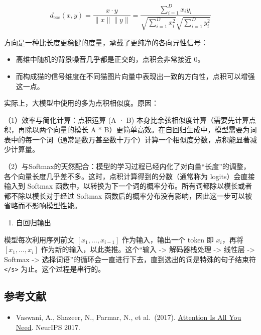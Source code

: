 \[
d_{\cos}(x,y)=\frac{x\cdot y}{\|x\|\|y\|}=\frac{\sum_{i=1}^{D}x_i y_i}{\sqrt{\sum_{i=1}^{D}x_i^2}\sqrt{\sum_{i=1}^{D}y_i^2}}
\]

方向是一种比长度更稳健的度量，承载了更纯净的各向异性信号：

\begin{itemize}
\tightlist
\item
  高维中随机的背景噪音几乎都是正交的，点积会非常接近 0。
\item
  而构成猫的信号维度在不同猫图片向量中表现出一致的方向性，点积可以增强这一点。
\end{itemize}

实际上，大模型中使用的多为点积相似度。原因：

（1）效率与简化计算\hspace{0pt}：点积运算 (A · B) 本身比余弦相似度计算（需要先计算点积，再除以两个向量的模长 \textbar\textbar A\textbar\textbar{} * \textbar\textbar B\textbar\textbar）更简单高效。在自回归生成中，模型需要为词表中的每一个词（通常是数万甚至数十万个）计算一个相似度分数，点积能显著减少计算量。

（2）与Softmax的天然配合：模型的学习过程已经内化了对向量``长度''的调整，各个向量长度几乎差不多。这时，点积计算得到的分数（通常称为 logits）会直接输入到 Softmax 函数中，以转换为下一个词的概率分布。所有词都除以模长或者都不除以模长对于经过 Softmax 函数后的概率分布没有影响，因此这一步可以被省略而不影响模型性能。

\begin{enumerate}
\def\labelenumi{\arabic{enumi}.}
\setcounter{enumi}{2}
\tightlist
\item
  自回归输出
\end{enumerate}

模型每次利用序列前文 \([x_1,\ldots,x_{i-1}]\) 作为输入，输出一个 token 即 \(x_i\)，再将 \([x_1,\ldots,x_i]\) 作为新的输入，以此类推。这个``输入 -\textgreater{} 解码器栈处理 -\textgreater{} 线性层 -\textgreater{} Softmax -\textgreater{} 选择词语''的循环会一直进行下去，直到选出的词是特殊的句子结束符 \texttt{\textless{}/s\textgreater{}} 为止。这个过程是串行的。

\hypertarget{ux53c2ux8003ux6587ux732e-68}{%
\subsection{参考文献}\label{ux53c2ux8003ux6587ux732e-68}}

\begin{itemize}
\tightlist
\item
  Vaswani, A., Shazeer, N., Parmar, N., et al.~(2017). \href{https://arxiv.org/abs/1706.03762}{Attention Is All You Need}. NeurIPS 2017.
\end{itemize}

